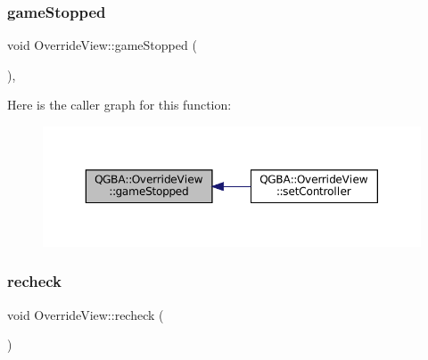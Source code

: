 \subsubsection{\texorpdfstring{game\+Stopped}{gameStopped}}
{\footnotesize\ttfamily void Override\+View\+::game\+Stopped (\begin{DoxyParamCaption}{ }\end{DoxyParamCaption})\hspace{0.3cm}{\ttfamily [private]}, {\ttfamily [slot]}}

Here is the caller graph for this function\+:
\nopagebreak
\begin{figure}[H]
\begin{center}
\leavevmode
\includegraphics[width=350pt]{class_q_g_b_a_1_1_override_view_a4b01ad226af53be0d7454647e3a1c4ea_icgraph}
\end{center}
\end{figure}
\mbox{\label{class_q_g_b_a_1_1_override_view_ae0189dfd85dda5d45756da0344c09634}} 
\subsubsection{\texorpdfstring{recheck}{recheck}}
{\footnotesize\ttfamily void Override\+View\+::recheck (\begin{DoxyParamCaption}{ }\end{DoxyParamCaption})\hspace{0.3cm}{\ttfamily [slot]}}

